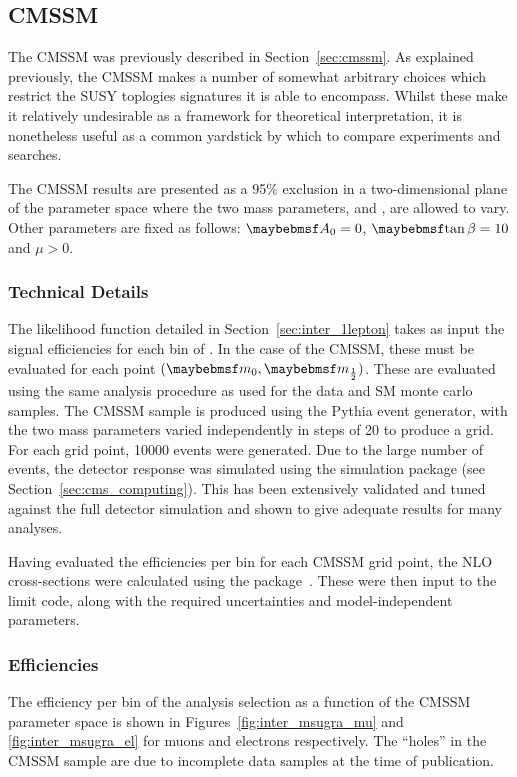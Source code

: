 \subsection{\ac{CMSSM}}
The \ac{CMSSM} was previously described in Section~\ref{sec:cmssm}. As explained
previously, the \ac{CMSSM} makes a number of somewhat arbitrary choices which
restrict the \ac{SUSY} toplogies signatures it is able to encompass. Whilst
these make it relatively undesirable as a framework for theoretical
interpretation, it is nonetheless useful as a common yardstick by which to
compare experiments and searches.

The \ac{CMSSM} results are presented as a 95\% exclusion in a two-dimensional
plane of the parameter space where the two mass parameters, \Mzero and \Mhalf,
are allowed to vary. Other parameters are fixed as follows: $\Azero = 0$,
$\tanbeta = 10$ and $\mu > 0$.

\subsubsection{Technical Details}
The likelihood function detailed in Section~\ref{sec:inter_1lepton} takes as
input the signal efficiencies for each bin of \STlep. In the case of the
\ac{CMSSM}, these must be evaluated for each point $(\Mzero, \Mhalf)$. These are
evaluated using the same analysis procedure as used for the data and \ac{SM}
monte carlo samples. The \ac{CMSSM} sample is produced using the Pythia event
generator, with the two mass parameters varied independently in steps of
\unit{20}{\GeV} to produce a grid. For each grid point, 10000 events were
generated. Due to the large number of events, the detector response was
simulated using the \fastsim simulation package (see
Section~\ref{sec:cms_computing}). This has been extensively validated and tuned
against the full detector simulation and shown to give adequate results for many
analyses.

Having evaluated the efficiencies per \STlep bin for each \ac{CMSSM} grid point,
the \ac{NLO} cross-sections were calculated using the \prospino
package~\cite{prospino}. These were then input to the limit code, along with the
required uncertainties and model-independent parameters.

\subsubsection{Efficiencies}
The efficiency per \STlep bin of the analysis selection as a function of the
\ac{CMSSM} parameter space is shown in Figures~\ref{fig:inter_msugra_mu} and
\ref{fig:inter_msugra_el} for muons and electrons respectively. The ``holes'' in
the \ac{CMSSM} sample are due to incomplete data samples at the time of
publication.

